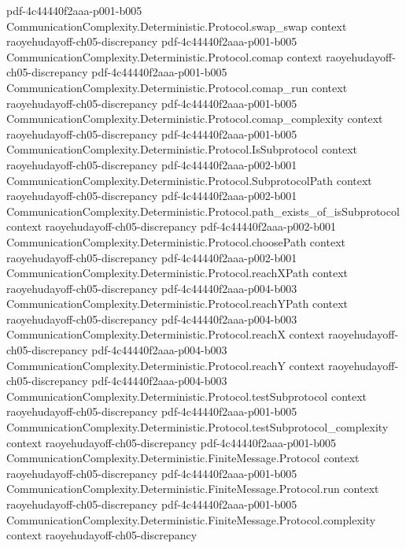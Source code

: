 \begin{theorem}
  {pdf-4c44440f2aaa-p001-b005}
\proofstep
  {CommunicationComplexity.Deterministic.Protocol.swap_swap}
  {context}
  {raoyehudayoff-ch05-discrepancy}
  {pdf-4c44440f2aaa-p001-b005}
\proofstep
  {CommunicationComplexity.Deterministic.Protocol.comap}
  {context}
  {raoyehudayoff-ch05-discrepancy}
  {pdf-4c44440f2aaa-p001-b005}
\proofstep
  {CommunicationComplexity.Deterministic.Protocol.comap_run}
  {context}
  {raoyehudayoff-ch05-discrepancy}
  {pdf-4c44440f2aaa-p001-b005}
\proofstep
  {CommunicationComplexity.Deterministic.Protocol.comap_complexity}
  {context}
  {raoyehudayoff-ch05-discrepancy}
  {pdf-4c44440f2aaa-p001-b005}
\proofstep
  {CommunicationComplexity.Deterministic.Protocol.IsSubprotocol}
  {context}
  {raoyehudayoff-ch05-discrepancy}
  {pdf-4c44440f2aaa-p002-b001}
\proofstep
  {CommunicationComplexity.Deterministic.Protocol.SubprotocolPath}
  {context}
  {raoyehudayoff-ch05-discrepancy}
  {pdf-4c44440f2aaa-p002-b001}
\proofstep
  {CommunicationComplexity.Deterministic.Protocol.path_exists_of_isSubprotocol}
  {context}
  {raoyehudayoff-ch05-discrepancy}
  {pdf-4c44440f2aaa-p002-b001}
\proofstep
  {CommunicationComplexity.Deterministic.Protocol.choosePath}
  {context}
  {raoyehudayoff-ch05-discrepancy}
  {pdf-4c44440f2aaa-p002-b001}
\proofstep
  {CommunicationComplexity.Deterministic.Protocol.reachXPath}
  {context}
  {raoyehudayoff-ch05-discrepancy}
  {pdf-4c44440f2aaa-p004-b003}
\proofstep
  {CommunicationComplexity.Deterministic.Protocol.reachYPath}
  {context}
  {raoyehudayoff-ch05-discrepancy}
  {pdf-4c44440f2aaa-p004-b003}
\proofstep
  {CommunicationComplexity.Deterministic.Protocol.reachX}
  {context}
  {raoyehudayoff-ch05-discrepancy}
  {pdf-4c44440f2aaa-p004-b003}
\proofstep
  {CommunicationComplexity.Deterministic.Protocol.reachY}
  {context}
  {raoyehudayoff-ch05-discrepancy}
  {pdf-4c44440f2aaa-p004-b003}
\proofstep
  {CommunicationComplexity.Deterministic.Protocol.testSubprotocol}
  {context}
  {raoyehudayoff-ch05-discrepancy}
  {pdf-4c44440f2aaa-p001-b005}
\proofstep
  {CommunicationComplexity.Deterministic.Protocol.testSubprotocol_complexity}
  {context}
  {raoyehudayoff-ch05-discrepancy}
  {pdf-4c44440f2aaa-p001-b005}
\proofstep
  {CommunicationComplexity.Deterministic.FiniteMessage.Protocol}
  {context}
  {raoyehudayoff-ch05-discrepancy}
  {pdf-4c44440f2aaa-p001-b005}
\proofstep
  {CommunicationComplexity.Deterministic.FiniteMessage.Protocol.run}
  {context}
  {raoyehudayoff-ch05-discrepancy}
  {pdf-4c44440f2aaa-p001-b005}
\proofstep
  {CommunicationComplexity.Deterministic.FiniteMessage.Protocol.complexity}
  {context}
  {raoyehudayoff-ch05-discrepancy}

\end{theorem}
